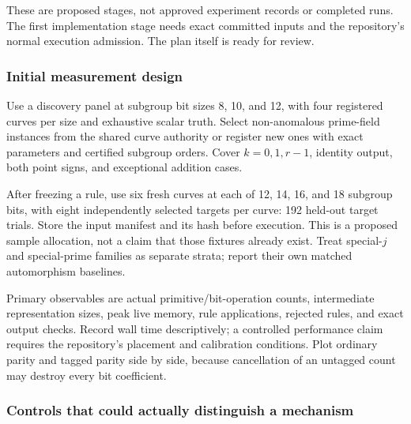 \documentclass[
  10pt,
]{article}
\begin{document}
These are proposed stages, not approved experiment records or completed
runs. The first implementation stage needs exact committed inputs and
the repository's normal execution admission. The plan itself is ready
for review.

\subsubsection{Initial measurement
design}\label{initial-measurement-design}

Use a discovery panel at subgroup bit sizes 8, 10, and 12, with four
registered curves per size and exhaustive scalar truth. Select
non-anomalous prime-field instances from the shared curve authority or
register new ones with exact parameters and certified subgroup orders.
Cover \(k=0,1,r-1\), identity output, both point signs, and exceptional
addition cases.

After freezing a rule, use six fresh curves at each of 12, 14, 16, and
18 subgroup bits, with eight independently selected targets per curve:
192 held-out target trials. Store the input manifest and its hash before
execution. This is a proposed sample allocation, not a claim that those
fixtures already exist. Treat special-\(j\) and special-prime families
as separate strata; report their own matched automorphism baselines.

Primary observables are actual primitive/bit-operation counts,
intermediate representation sizes, peak live memory, rule applications,
rejected rules, and exact output checks. Record wall time descriptively;
a controlled performance claim requires the repository's placement and
calibration conditions. Plot ordinary parity and tagged parity side by
side, because cancellation of an untagged count may destroy every bit
coefficient.

\subsubsection{Controls that could actually distinguish a
mechanism}\label{controls-that-could-actually-distinguish-a-mechanism}
\end{document}
